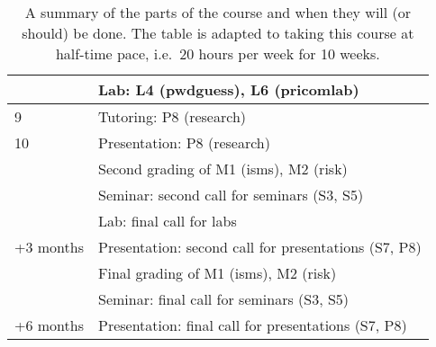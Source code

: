 \begin{table}
\begin{tabular}{lp{9cm}}
    & Lab: L4 (pwdguess), L6 (pricomlab)\\
    \midrule
    9
    & Tutoring: P8 (research)\\
    \midrule
    10
    & Presentation: P8 (research)\\
    & Second grading of M1 (isms), M2 (risk)\\
    & Seminar: second call for seminars (S3, S5)\\
    & Lab: final call for labs\\
    \midrule
    +3 months
    & Presentation: second call for presentations (S7, P8)\\
    & Final grading of M1 (isms), M2 (risk)\\
    & Seminar: final call for seminars (S3, S5)\\
    \midrule
    +6 months
    & Presentation: final call for presentations (S7, P8)\\
    \bottomrule
  \end{tabular}
  \caption{%
    A summary of the parts of the course and when they will (or should) be done.
    The table is adapted to taking this course at half-time pace, i.e.\ 20 hours 
    per week for 10 weeks.
  }\label{Schedule}
\end{table}

